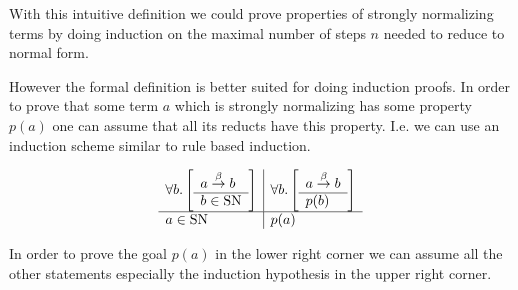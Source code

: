 With this intuitive definition we could prove properties of strongly normalizing
terms by doing induction on the maximal number of steps $n$ needed to reduce to
normal form.


However the formal definition is better suited for doing induction proofs. In
order to prove that some term $a$ which is strongly normalizing has some
property $p(a)$ one can assume that all its reducts have this property. I.e. we
can use an induction scheme similar to rule based induction.

$$
    \begin{array}{l|l}
        \forall b. \left[ \begin{array}{l} a \stackrel{\beta}{\to} b \\ \hline b \in \text{SN}\end{array} \right]
        &
        \forall b. \left[ \begin{array}{l} a \stackrel{\beta}{\to} b \\ \hline p(b)\end{array} \right]
        \\
        \hline
        a \in \text{SN}
        &
        p(a)
    \end{array}
$$

In order to prove the goal $p(a)$ in the lower right corner we can assume all
the other statements especially the induction hypothesis in the upper right
corner.


